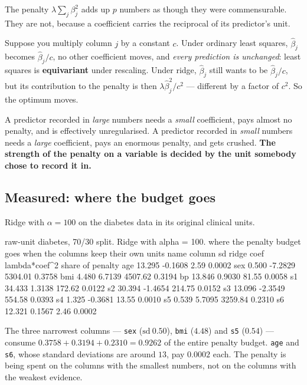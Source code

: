 \documentclass[11pt]{article}
\newcommand{\bhat}{\hat\beta}
\begin{document}
The penalty $\lambda\sum_j\beta_j^2$ adds up $p$ numbers as though they were
commensurable. They are not, because a coefficient carries the reciprocal of
its predictor's unit.

Suppose you multiply column $j$ by a constant $c$. Under ordinary least
squares, $\bhat_j$ becomes $\bhat_j/c$, no other coefficient moves, and
\emph{every prediction is unchanged}: least squares is
\textbf{equivariant} under rescaling. Under ridge, $\bhat_j$ still wants to be
$\bhat_j/c$, but its contribution to the penalty is then
$\lambda\bhat_j^2/c^2$ --- different by a factor of $c^2$. So the optimum
moves.

\begin{keyidea}
A predictor recorded in \emph{large} numbers needs a \emph{small} coefficient,
pays almost no penalty, and is effectively unregularised. A predictor recorded
in \emph{small} numbers needs a \emph{large} coefficient, pays an enormous
penalty, and gets crushed. \textbf{The strength of the penalty on a variable
is decided by the unit somebody chose to record it in.}
\end{keyidea}

\subsection{Measured: where the budget goes}
\label{sec:budget}

Ridge with $\alpha = 100$ on the diabetes data in its original clinical units.

\begin{codeout}
raw-unit diabetes, 70/30 split. Ridge with alpha = 100.
  where the penalty budget goes when the columns keep their own units
     name    column sd    ridge coef   lambda*coef^2   share of penalty
     age       13.295       -0.1608            2.59         0.0002
     sex        0.500       -7.2829         5304.01         0.3758
     bmi        4.480        6.7139         4507.62         0.3194
     bp        13.846        0.9030           81.55         0.0058
     s1        34.433        1.3138          172.62         0.0122
     s2        30.394       -1.4654          214.75         0.0152
     s3        13.096       -2.3549          554.58         0.0393
     s4         1.325       -0.3681           13.55         0.0010
     s5         0.539        5.7095         3259.84         0.2310
     s6        12.321        0.1567            2.46         0.0002
\end{codeout}

The three narrowest columns --- \texttt{sex} ($\mathrm{sd}\ 0.50$),
\texttt{bmi} ($4.48$) and \texttt{s5} ($0.54$) --- consume
$0.3758 + 0.3194 + 0.2310 = 0.9262$ of the entire penalty budget.
\texttt{age} and \texttt{s6}, whose standard deviations are around $13$, pay
$0.0002$ each. The penalty is being spent on the columns with the smallest
numbers, not on the columns with the weakest evidence.
\end{document}
